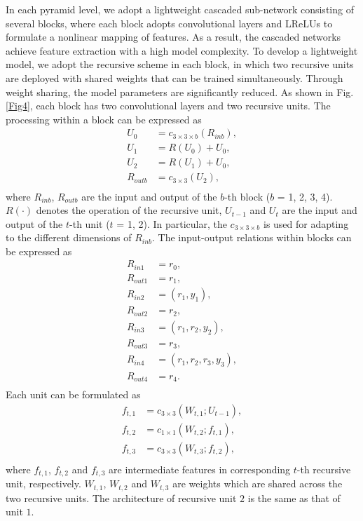\documentclass[journal]{IEEEtran}
\begin{document}
In each pyramid level, we adopt a lightweight cascaded sub-network consisting of several blocks, where each block adopts convolutional layers and LReLUs to formulate a nonlinear mapping of features. As a result, the cascaded networks achieve feature extraction with a high model complexity. To develop a lightweight model, we adopt the recursive scheme in each block, in which two recursive units are deployed with shared weights that can be trained simultaneously. Through weight sharing, the model parameters are significantly reduced. As shown in Fig. \ref{Fig4}, each block has two convolutional layers and two recursive units. The processing within a block can be expressed as
\begin{equation}
 \begin{aligned}
U_{0}&=c_{3 \times 3 \times b}(R_{inb}),\\
U_{1}&=R(U_{0})+U_{0},\\
U_{2}&=R(U_{1})+U_{0},\\
R_{outb}&=c_{3 \times 3}(U_{2}),\\
\end{aligned}
\end{equation}
where \(R_{inb}\), \(R_{outb}\) are the input and output of the \(b\)-th block (\(b\) = 1, 2, 3, 4). \(R(\cdot)\) denotes the operation of the recursive unit, \(U_{t-1}\) and \(U_{t}\) are the input and output of the \(t\)-th unit (\(t\) = 1, 2). In particular, the \(c_{3 \times 3 \times b}\) is used for adapting to the different dimensions of \(R_{inb}\). The input-output relations within blocks can be expressed as
\begin{equation}
 \begin{aligned}
R_{in1}&=r_{0},\\
R_{out1}&=r_{1},\\
R_{in2}&=(r_{1},y_{1}),\\
R_{out2}&=r_{2},\\
R_{in3}&=(r_{1},r_{2},y_{2}),\\
R_{out3}&=r_{3},\\
R_{in4}&=(r_{1},r_{2},r_{3},y_{3}),\\
R_{out4}&=r_{4}.\\
\end{aligned}
\end{equation}
Each unit can be formulated as
\begin{equation}
\begin{aligned}
f_{t,1}&=c_{3 \times 3}(W_{t,1};U_{t-1}),\\
f_{t,2}&=c_{1 \times 1}(W_{t,2};f_{t,1}),\\
f_{t,3}&=c_{3 \times 3}(W_{t,3};f_{t,2}),\\
\end{aligned}
\end{equation}
where \(f_{t,1}\), \(f_{t,2}\) and \(f_{t,3}\) are intermediate features in corresponding \(t\)-th recursive unit, respectively. \(W_{t,1}\), \(W_{t,2}\) and \(W_{t,3}\) are weights which are shared across the two recursive units. The architecture of recursive unit \(2\) is the same as that of unit \(1\).
\end{document}
